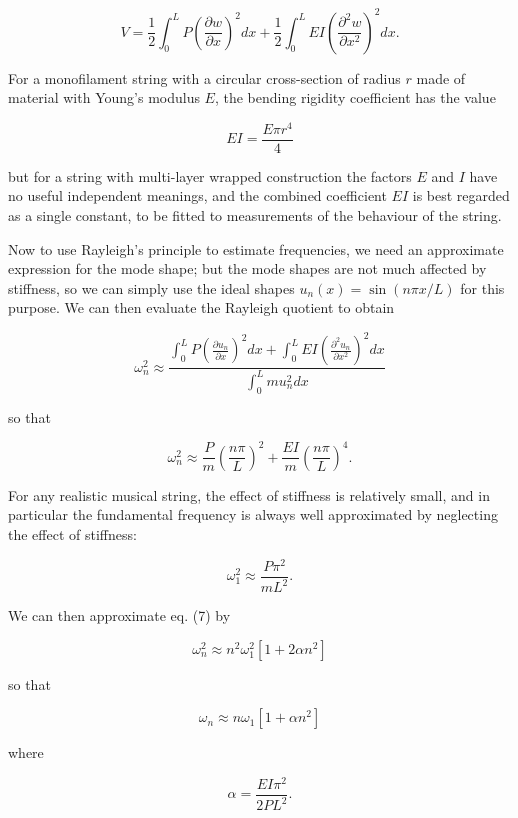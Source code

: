   \begin{equation*}V=\frac{1}{2}\int_0^L{P \left(\frac{\partial w}{\partial 
  x}\right)^2} dx + \frac{1}{2}\int_0^L{E I \left(\frac{\partial^2 w}{\partial 
  x^2}\right)^2} dx . \tag{4}\end{equation*} 

  For a monofilament string with a circular cross-section of radius $r$ made of 
  material with Young's modulus $E$, the bending rigidity coefficient has the 
  value 

  \begin{equation*}EI=\dfrac{E \pi r^4}{4} \tag{5}\end{equation*} 

  \noindent{}but for a string with multi-layer wrapped construction the factors 
  $E$ and $I$ have no useful independent meanings, and the combined coefficient 
  $EI$ is best regarded as a single constant, to be fitted to measurements of 
  the behaviour of the string. 

  Now to use Rayleigh's principle to estimate frequencies, we need an 
  approximate expression for the mode shape; but the mode shapes are not much 
  affected by stiffness, so we can simply use the ideal shapes $u_n(x)=\sin(n 
  \pi x/L)$ for this purpose. We can then evaluate the Rayleigh quotient to 
  obtain 

  \begin{equation*}\omega_n^2 \approx \dfrac{\int_0^L{P \left(\frac{\partial 
  u_n}{\partial x}\right)^2} dx + \int_0^L{E I \left(\frac{\partial^2 
  u_n}{\partial x^2}\right)^2} dx}{\int_0^L{m u_n^2} dx} \tag{6}\end{equation*} 

  \noindent{}so that 

  \begin{equation*}\omega_n^2 \approx \dfrac{P}{m} \left(\dfrac{n 
  \pi}{L}\right)^2 + \dfrac{EI}{m} \left(\dfrac{n \pi}{L}\right)^4 . 
  \tag{7}\end{equation*} 

  For any realistic musical string, the effect of stiffness is relatively 
  small, and in particular the fundamental frequency is always well 
  approximated by neglecting the effect of stiffness: 

  \begin{equation*}\omega_1^2 \approx \dfrac{P \pi^2}{mL^2} . 
  \tag{8}\end{equation*} 

  We can then approximate eq. (7) by 

  \begin{equation*}\omega_n^2 \approx n^2 \omega_1^2 \left[1 + 2 \alpha n^2 
  \right] \tag{9}\end{equation*} 

  \noindent{}so that 

  \begin{equation*}\omega_n \approx n \omega_1 \left[1 + \alpha n^2 \right] 
  \tag{10}\end{equation*} 

  \noindent{}where 

  \begin{equation*}\alpha= \dfrac{EI \pi^2}{2P L^2} . \tag{11}\end{equation*} 